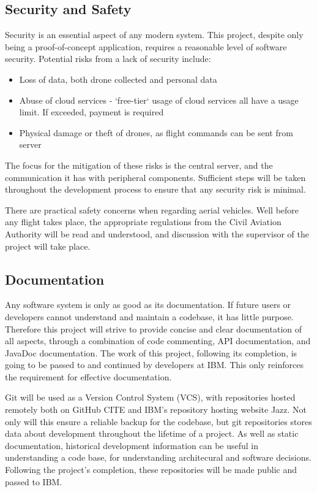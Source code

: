 \documentclass{article}
\begin{document}
\subsection{Security and Safety}
Security is an essential aspect of any modern system. This project, despite only being a proof-of-concept application, requires a reasonable level of software security. Potential risks from a lack of security include:
\begin{itemize}
	\item Loss of data, both drone collected and personal data
	\item Abuse of cloud services - `free-tier` usage of cloud services all have a usage limit. If exceeded, payment is required
	\item Physical damage or theft of drones, as flight commands can be sent from server
\end{itemize}
The focus for the mitigation of these risks is the central server, and the communication it has with peripheral components. Sufficient steps will be taken throughout the development process to ensure that any security risk is minimal.

There are practical safety concerns when regarding aerial vehicles. Well before any flight takes place, the appropriate regulations from the Civil Aviation Authority will be read and understood, and discussion with the supervisor of the project will take place.

\subsection{Documentation}
Any software system is only as good as its documentation. If future users or developers cannot understand and maintain a codebase, it has little purpose. Therefore this project will strive to provide concise and clear documentation of all aspects, through a combination of code commenting, API documentation, and JavaDoc documentation. The work of this project, following its completion, is going to be passed to and continued by developers at IBM. This only reinforces the requirement for effective documentation.

Git will be used as a Version Control System (VCS), with repositories hosted remotely both on GitHub CITE and IBM's repository hosting website Jazz\cite{jazz}. Not only will this ensure a reliable backup for the codebase, but git repositories stores data about development throughout the lifetime of a project. As well as static documentation, historical development information can be useful in understanding a code base, for understanding architecural and software decisions. Following the project's completion, these repositories will be made public and passed to IBM.
\end{document}
